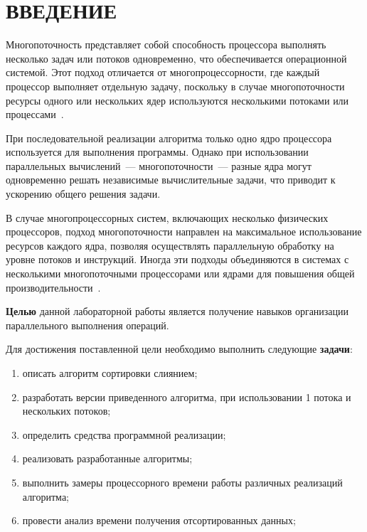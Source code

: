 \chapter*{\hfill{\centering  ВВЕДЕНИЕ}\hfill}

Многопоточность представляет собой способность процессора выполнять несколько задач или потоков одновременно, что обеспечивается операционной системой. 
Этот подход отличается от многопроцессорности, где каждый процессор выполняет отдельную задачу, поскольку в случае многопоточности ресурсы одного или нескольких ядер используются несколькими потоками или процессами~\cite{muti-thread}.

При последовательной реализации алгоритма только одно ядро процессора используется для выполнения программы. 
Однако при использовании параллельных вычислений~--- многопоточности~--- разные ядра могут одновременно решать независимые вычислительные задачи, что приводит к ускорению общего решения задачи.

В случае многопроцессорных систем, включающих несколько физических процессоров, подход многопоточности направлен на максимальное использование ресурсов каждого ядра, позволяя осуществлять параллельную обработку на уровне потоков и инструкций. 
Иногда эти подходы объединяются в системах с несколькими многопоточными процессорами или ядрами для повышения общей производительности~\cite{muti-thread}.

\textbf{Целью} данной лабораторной работы является получение навыков организации параллельного выполнения операций.

Для достижения поставленной цели необходимо выполнить следующие \textbf{задачи}:
\begin{enumerate}
	\item описать алгоритм сортировки слиянием;
	\item разработать версии  приведенного алгоритма, при использовании 1 потока и нескольких потоков;
	\item определить средства программной реализации;
	\item реализовать разработанные алгоритмы;
	\item выполнить замеры процессорного времени работы различных реализаций алгоритма;
	\item провести анализ времени получения отсортированных данных;
\end{enumerate}